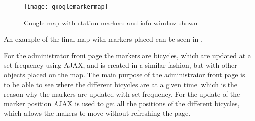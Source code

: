 \begin{figure}[h]
	\centering
	\texttt{[image: googlemarkermap]}
	\caption{Google map with station markers and info window shown.}
	\label{fig:googlemapmarkerinfowindow}
\end{figure}

An example of the final map with markers placed can be seen in .

For the administrator front page the markers are bicycles, which are updated at a set frequency using AJAX, and is created in a similar fashion, but with other objects placed on the map.
The main purpose of the administrator front page is to be able to see where the different bicycles are at a given time, which is the reason why the markers are updated with set frequency.
For the update of the marker position AJAX is used to get all the positions of the different bicycles, which allows the makers to move without refreshing the page.